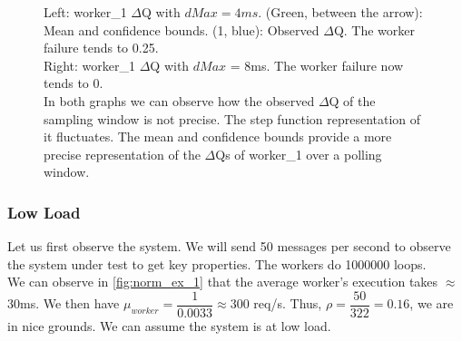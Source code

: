 \begin{figure}[H]
\begin{subfigure}{.5\textwidth}
                \label{fig:w18}
            \end{subfigure}
            \caption{Left: worker\_1 $\Delta$Q with $dMax = 4ms$. (Green, between the arrow): Mean and confidence bounds. (1, blue): Observed $\Delta$Q. The worker failure tends to 0.25. \\
            Right: worker\_1 $\Delta$Q with $dMax$ = 8ms. The worker failure now tends to 0. \\
            In both graphs we can observe how the observed $\Delta$Q of the sampling window is not precise. The step function representation of it fluctuates. The mean and confidence bounds provide a more precise representation of the $\Delta$Qs of worker\_1 over a polling window.}%
            \label{fig:w1w2hb}
            \end{figure}

    \subsubsection{Low Load} 
    Let us first observe the system. We will send 50 messages per second to observe the system under test to get key properties. The workers do 1000000 loops. \\
    We can observe in \cref{fig:norm_ex_1} that the average worker's execution takes $\approx$ 30ms. We then have $\mu_{worker} = \dfrac{1}{0.0033} \approx 300$ req/s. Thus, $\rho = \dfrac{50}{322} = 0.16$, we are in nice grounds. We can assume the system is at low load.

